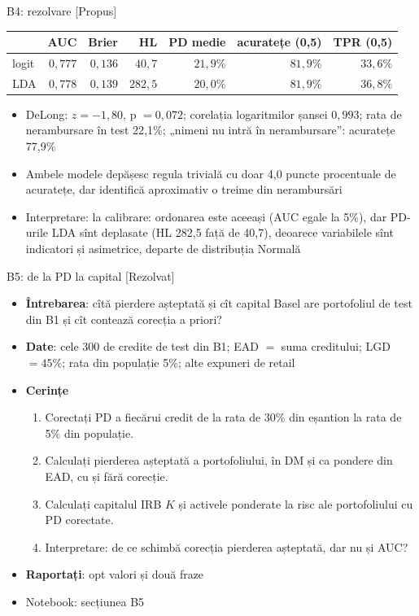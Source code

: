 \ifsolutions
\begin{frame}{B4: rezolvare [Propus]}
\itemsize{\footnotesize}
\begin{center}
\scriptsize
\begin{tabular}{lrrrrrr}
\toprule
& AUC & Brier & HL & PD medie & acuratețe (0,5) & TPR (0,5) \\
\midrule
logit & $0{,}777$ & $0{,}136$ & $40{,}7$ & $21{,}9\%$ & $81{,}9\%$ & $33{,}6\%$ \\
LDA & $0{,}778$ & $0{,}139$ & $282{,}5$ & $20{,}0\%$ & $81{,}9\%$ & $36{,}8\%$ \\
\bottomrule
\end{tabular}
\end{center}
\begin{itemize}
    \item DeLong: $z = -1{,}80$, p $= 0{,}072$; corelația logaritmilor șansei $0{,}993$; rata de nerambursare în test 22{,}1\%; „nimeni nu intră în nerambursare”: acuratețe 77{,}9\%
    \item Ambele modele depășesc regula trivială cu doar 4{,}0 puncte procentuale de acuratețe, dar identifică aproximativ o treime din nerambursări
    \item Interpretare: la calibrare: ordonarea este aceeași (AUC egale la 5\%), dar PD-urile LDA sînt deplasate (HL 282{,}5 față de 40{,}7), deoarece variabilele sînt indicatori și asimetrice, departe de distribuția Normală
\end{itemize}
\end{frame}
\fi

\begin{frame}{B5: de la PD la capital [Rezolvat]}
\itemsize{\footnotesize}
\begin{itemize}
\item \textbf{Întrebarea}: cîtă pierdere așteptată și cît capital Basel are portofoliul de test din B1 și cît contează corecția a priori?
\item \textbf{Date}: cele 300 de credite de test din B1; EAD $=$ suma creditului; LGD $= 45\%$; rata din populație 5\%; alte expuneri de retail
\item \textbf{Cerințe}
\begin{enumerate}
    \item Corectați PD a fiecărui credit de la rata de 30\% din eșantion la rata de 5\% din populație.
    \item Calculați pierderea așteptată a portofoliului, în DM și ca pondere din EAD, cu și fără corecție.
    \item Calculați capitalul IRB $K$ și activele ponderate la risc ale portofoliului cu PD corectate.
    \item Interpretare: de ce schimbă corecția pierderea așteptată, dar nu și AUC?
\end{enumerate}
\item \textbf{Raportați}: opt valori și două fraze
\item Notebook: secțiunea B5
\end{itemize}
\end{frame}

